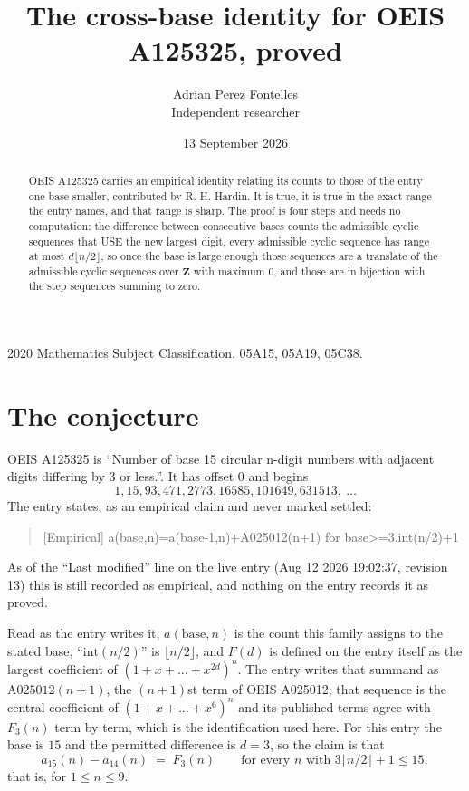 \documentclass[11pt,a4paper]{article}
\title{The cross-base identity for OEIS A125325, proved}
\author{Adrian Perez Fontelles\\ \small Independent researcher}
\date{13 September 2026}
\theoremstyle{plain}
\theoremstyle{definition}
\begin{document}
\maketitle

\begin{abstract}
OEIS A125325 carries an empirical identity relating its counts to those of the entry one base
smaller, contributed by R. H. Hardin. It is true, it is true in the exact range the entry
names, and that range is sharp. The proof is four steps and needs no computation: the
difference between consecutive bases counts the admissible cyclic sequences that USE the new
largest digit, every admissible cyclic sequence has range at most $d\lfloor n/2\rfloor$, so
once the base is large enough those sequences are a translate of the admissible cyclic
sequences over $\mathbf{Z}$ with maximum $0$, and those are in bijection with the step
sequences summing to zero.
\end{abstract}

\noindent\small 2020 Mathematics Subject Classification. 05A15, 05A19, 05C38.\normalsize

\section{The conjecture}

OEIS A125325 is ``Number of base 15 circular n-digit numbers with adjacent digits differing by 3 or less.''. It has offset $0$ and begins
\[
1, 15, 93, 471, 2773, 16585, 101649, 631513,\ \dots
\]
The entry states, as an empirical claim and never marked settled:
\begin{quote}
[Empirical] a(base,n)=a(base-1,n)+A025012(n+1) for base>=3.int(n/2)+1
\end{quote}
As of the ``Last modified'' line on the live entry (Aug 12 2026 19:02:37, revision 13)
this is still recorded as empirical, and nothing on the entry records it as proved.

Read as the entry writes it, $a(\mathrm{base},n)$ is the count this family assigns to the
stated base, ``$\mathrm{int}(n/2)$'' is $\lfloor n/2\rfloor$, and $F(d)$ is defined on the
entry itself as the largest coefficient of $(1+x+\dots+x^{2d})^{n}$. The entry writes that summand as $\mathrm{A025012}(n+1)$, the $(n+1)$st term of OEIS A025012; that sequence is the central coefficient of $(1+x+\dots+x^{6})^{n}$ and its published terms agree with $F_{3}(n)$ term by term, which is the identification used here. For this entry
the base is $15$ and the permitted difference is $d=3$, so the claim is that
\[
a_{15}(n)-a_{14}(n)\;=\;F_{3}(n)
\qquad\text{for every } n \text{ with } 3\lfloor n/2\rfloor+1\le15,
\]
that is, for $1\le n\le9$.
\end{document}
